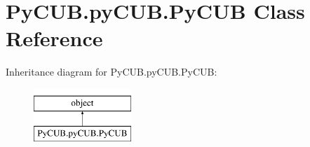 \hypertarget{class_py_c_u_b_1_1py_c_u_b_1_1_py_c_u_b}{}\section{Py\+C\+U\+B.\+py\+C\+U\+B.\+Py\+C\+UB Class Reference}
\label{class_py_c_u_b_1_1py_c_u_b_1_1_py_c_u_b}
Inheritance diagram for Py\+C\+U\+B.\+py\+C\+U\+B.\+Py\+C\+UB\+:\begin{figure}[H]
\begin{center}
\leavevmode
\includegraphics[height=2.000000cm]{class_py_c_u_b_1_1py_c_u_b_1_1_py_c_u_b}
\end{center}
\end{figure}
